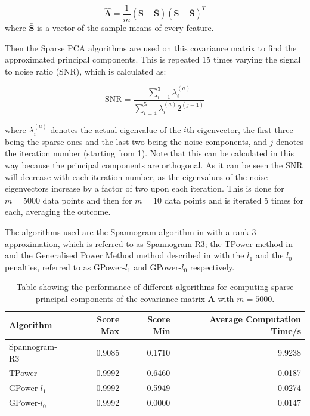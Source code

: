 \documentclass[11pt,a4paper]{article}
\begin{document}
\begin{equation*}
\mathbf{\hat{A}} = \frac{1}{m}\left(\mathbf{S} - \bar{\mathbf{S}}\right)\left(\mathbf{S} - \bar{\mathbf{S}}\right)^T
\end{equation*}
where $\bar{\mathbf{S}}$ is a vector of the sample means of every feature.

Then the Sparse PCA algorithms are used on this covariance matrix to find the approximated principal components. This is repeated 15 times varying the signal to noise ratio (SNR), which is calculated as:

\begin{equation*}
\text{SNR} = \frac{\sum_{i = 1}^3\lambda_i^{(a)}}{\sum_{i = 4}^5\lambda_i^{(a)}2^{(j-1)}}
\end{equation*}

where $\lambda_i^{(a)}$ denotes the actual eigenvalue of the $i$th eigenvector, the first three being the sparse ones and the last two being the noise components, and $j$ denotes the iteration number (starting from 1). Note that this can be calculated in this way because the principal components are orthogonal. As it can be seen the SNR will decrease with each iteration number, as the eigenvalues of the noise eigenvectors increase by a factor of two upon each iteration. This is done for $m=5000$ data points and then for $m=10$ data points and is iterated 5 times for each, averaging the outcome. 

The algorithms used are the Spannogram algorithm in \cite{dimakis} with a rank 3 approximation, which is referred to as Spannogram-R3; the TPower method in \cite{truncpower} and the Generalised Power Method method described in \cite{GPower} with the $l_1$ and the $l_0$ penalties, referred to as GPower-$l_1$ and GPower-$l_0$ respectively.

\begin{table}[H]
\center
\begin{tabular}{|l|r|r|r|}
\hline
Algorithm &  Score Max & Score Min & Average Computation Time/s\\
\hline
Spannogram-R3 &0.9085 &    0.1710 &   9.9238\\
TPower &    0.9992 &   0.6460&    0.0187 \\
 GPower-$l_1$&   0.9992  &  0.5949&    0.0274\\
 GPower-$l_0$  & 0.9992&         0.0000   & 0.0147\\
\hline

\end{tabular}
\caption{Table showing the performance of different algorithms for computing sparse principal components of the covariance matrix $\mathbf{A}$ with $m=5000$.}
\label{performance_5000}
\end{table}
\end{document}
